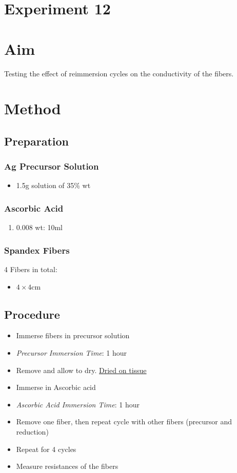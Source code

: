 \documentclass{article}
\begin{document}
\section*{Experiment 12}

\section{Aim}
Testing the effect of reimmersion cycles on the conductivity of the fibers.

\section{Method}
\subsection{Preparation}
\subsubsection{Ag Precursor Solution}
\begin{itemize}
    \item  1.5g solution of  35\% wt
\end{itemize}

\subsubsection{Ascorbic Acid}
\begin{enumerate}
    \item 0.008 wt: 10ml
\end{enumerate}

\subsubsection{Spandex Fibers}
4 Fibers in total:
\begin{itemize}
    \item $4\times 4$cm
\end{itemize}

\subsection{Procedure}
\begin{itemize}
    \item Immerse fibers in precursor solution
    \item \textit{Precursor Immersion Time}: 1 hour
    \item Remove and allow to dry. \underline{Dried on tissue}
    \item Immerse  in Ascorbic acid
    \item \textit{Ascorbic Acid Immersion Time}: 1 hour 
    \item Remove one fiber, then repeat cycle with other fibers (precursor and reduction)
    \item Repeat for 4 cycles
    \item Measure resistances of the fibers
\end{itemize}
\end{document}
